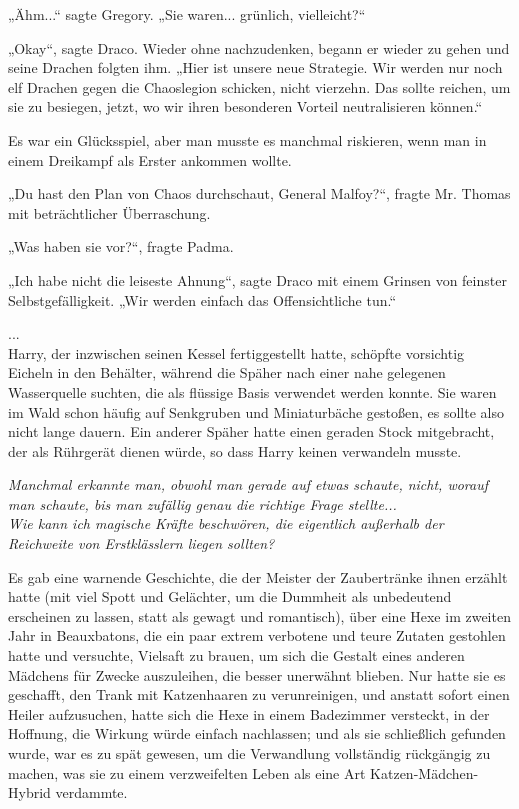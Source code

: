 {„Ähm...“ sagte Gregory. „Sie waren... grünlich, vielleicht?“

„Okay“, sagte Draco. Wieder ohne nachzudenken, begann er wieder zu gehen und seine Drachen folgten ihm. „Hier ist unsere neue Strategie. Wir werden nur noch elf Drachen gegen die Chaoslegion schicken, nicht vierzehn. Das sollte reichen, um sie zu besiegen, jetzt, wo wir ihren besonderen Vorteil neutralisieren können.“

Es war ein Glücksspiel, aber man musste es manchmal riskieren, wenn man in einem Dreikampf als Erster ankommen wollte.

„Du hast den Plan von Chaos durchschaut, General Malfoy?“, fragte Mr. Thomas mit beträchtlicher Überraschung.

„Was haben sie vor?“, fragte Padma.

„Ich habe nicht die leiseste Ahnung“, sagte Draco mit einem Grinsen von feinster Selbstgefälligkeit. „Wir werden einfach das Offensichtliche tun.“

...\\ Harry, der inzwischen seinen Kessel fertiggestellt hatte, schöpfte vorsichtig Eicheln in den Behälter, während die Späher nach einer nahe gelegenen Wasserquelle suchten, die als flüssige Basis verwendet werden konnte. Sie waren im Wald schon häufig auf Senkgruben und Miniaturbäche gestoßen, es sollte also nicht lange dauern. Ein anderer Späher hatte einen geraden Stock mitgebracht, der als Rührgerät dienen würde, so dass Harry keinen verwandeln musste.

\emph{Manchmal erkannte man, obwohl man gerade auf etwas schaute, nicht, worauf man schaute, bis man zufällig genau die richtige Frage stellte...}\\ \emph{Wie kann ich magische Kräfte beschwören, die eigentlich außerhalb der Reichweite von Erstklässlern liegen sollten?}

Es gab eine warnende Geschichte, die der Meister der Zaubertränke ihnen erzählt hatte (mit viel Spott und Gelächter, um die Dummheit als unbedeutend erscheinen zu lassen, statt als gewagt und romantisch), über eine Hexe im zweiten Jahr in Beauxbatons, die ein paar extrem verbotene und teure Zutaten gestohlen hatte und versuchte, Vielsaft zu brauen, um sich die Gestalt eines anderen Mädchens für Zwecke auszuleihen, die besser unerwähnt blieben. Nur hatte sie es geschafft, den Trank mit Katzenhaaren zu verunreinigen, und anstatt sofort einen Heiler aufzusuchen, hatte sich die Hexe in einem Badezimmer versteckt, in der Hoffnung, die Wirkung würde einfach nachlassen; und als sie schließlich gefunden wurde, war es zu spät gewesen, um die Verwandlung vollständig rückgängig zu machen, was sie zu einem verzweifelten Leben als eine Art Katzen-Mädchen-Hybrid verdammte.

}
